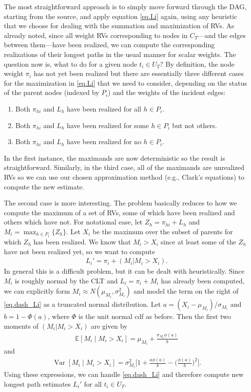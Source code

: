 \documentclass[12pt]{article}
\def\E{\mathbb{E}}
\def\Var{\operatorname{Var}}
\begin{document}
The most straightforward approach is to simply move forward through the DAG, starting from the source, and apply equation \eqref{eq.Li} again, using any heuristic that we choose for dealing with the summation and maximization of RVs. As already noted, since all weight RVs corresponding to nodes in $C_T$---and the edges between them---have been realized, we can compute the corresponding realizations of their longest paths in the usual manner for scalar weights. The question now is, what to do for a given node $t_i \in U_T$? By definition, the node weight $\pi_i$ has not yet been realized but there are essentially three different cases for the maximization in \eqref{eq.Li} that we need to consider, depending on the status of the parent nodes (indexed by $P_i$) and the weights of the incident edges:
\begin{enumerate}
\item Both $\pi_{hi}$ and $L_h$ have been realized for all $h \in P_i$.
\item Both $\pi_{hi}$ and $L_h$ have been realized for some $h \in P_i$ but not others. 
  \item Both $\pi_{hi}$ and $L_h$ have been realized for no $h \in P_i$.
  \end{enumerate}
  In the first instance, the maximands are now deterministic so the result is straightforward. Similarly, in the third case, all of the maximands are unrealized RVs so we can use our chosen approximation method (e.g., Clark's equations) to compute the new estimate.

The second case is more interesting. The problem basically reduces to how we compute the maximum of a set of RVs, some of which have been realized and others which have not. For notational ease, let $Z_h = \pi_{hi} + L_h$ and $M_i = \max_{h \in P_i} \{ Z_h  \}$.  Let $X_i$ be the maximum over the subset of parents for which $Z_h$ has been realized. We know that $M_i > X_i$ since at least some of the $Z_h$ have not been realized yet, so we want to compute
\begin{align}
  \label{eq.dash_Li}
  L_i' = \pi_i + (M_i | M_i > X_i). 
\end{align}
In general this is a difficult problem, but it can be dealt with heuristically. Since $M_i$ is roughly normal by the CLT and $L_i = \pi_i + M_i$ has already been computed, we can explicitly form $M_i \approx N(\mu_{M_i}, \sigma_{M_i}^2)$ and model the term on the right of \eqref{eq.dash_Li} as a truncated normal distribution. Let $a = (X_i - \mu_{M_i}) / \sigma_{M_i}$ and $b = 1 - \Phi(a)$, where $\Phi$ is the unit normal cdf as before. Then the first two moments of $(M_i | M_i > X_i)$ are given by
\begin{align*}
  \E[M_i \mid M_i > X_i] = \mu_{M_i} + \frac{\sigma_{M_i}\phi(a)}{b}
\end{align*}
and
\begin{align*}
  \Var[M_i \mid M_i > X_i] = \sigma_{M_i}^2 \bigg[ 1 + \frac{a\phi(a)}{b} - \bigg( \frac{\phi(a)}{b} \bigg)^2    \bigg].
\end{align*}
Using these expressions, we can handle \eqref{eq.dash_Li} and therefore compute new longest path estimates $L_i'$ for all $t_i \in U_T$.
\end{document}
